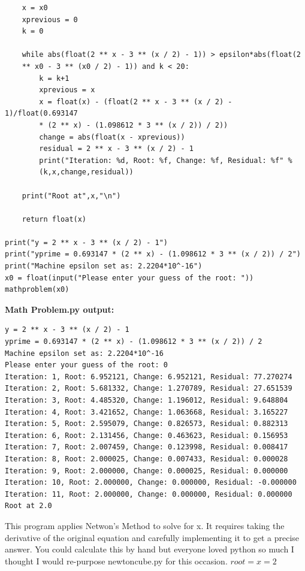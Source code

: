 \documentclass[12pt]{article}
\begin{document}
\begin{enumerate}[label=\textbf{\arabic*}.]
\begin{verbatim}
    x = x0
    xprevious = 0
    k = 0

    while abs(float(2 ** x - 3 ** (x / 2) - 1)) > epsilon*abs(float(2 
    ** x0 - 3 ** (x0 / 2) - 1)) and k < 20:
        k = k+1
        xprevious = x
        x = float(x) - (float(2 ** x - 3 ** (x / 2) - 1)/float(0.693147 
        * (2 ** x) - (1.098612 * 3 ** (x / 2)) / 2))
        change = abs(float(x - xprevious))
        residual = 2 ** x - 3 ** (x / 2) - 1
        print("Iteration: %d, Root: %f, Change: %f, Residual: %f" % 
        (k,x,change,residual))
    
    print("Root at",x,"\n")

    return float(x)

print("y = 2 ** x - 3 ** (x / 2) - 1")
print("yprime = 0.693147 * (2 ** x) - (1.098612 * 3 ** (x / 2)) / 2")
print("Machine epsilon set as: 2.2204*10^-16")
x0 = float(input("Please enter your guess of the root: "))
mathproblem(x0)
\end{verbatim}

\newpage

\textbf{Math Problem.py output:}
\begin{verbatim}
y = 2 ** x - 3 ** (x / 2) - 1
yprime = 0.693147 * (2 ** x) - (1.098612 * 3 ** (x / 2)) / 2
Machine epsilon set as: 2.2204*10^-16
Please enter your guess of the root: 0
Iteration: 1, Root: 6.952121, Change: 6.952121, Residual: 77.270274
Iteration: 2, Root: 5.681332, Change: 1.270789, Residual: 27.651539
Iteration: 3, Root: 4.485320, Change: 1.196012, Residual: 9.648804
Iteration: 4, Root: 3.421652, Change: 1.063668, Residual: 3.165227
Iteration: 5, Root: 2.595079, Change: 0.826573, Residual: 0.882313
Iteration: 6, Root: 2.131456, Change: 0.463623, Residual: 0.156953
Iteration: 7, Root: 2.007459, Change: 0.123998, Residual: 0.008417
Iteration: 8, Root: 2.000025, Change: 0.007433, Residual: 0.000028
Iteration: 9, Root: 2.000000, Change: 0.000025, Residual: 0.000000
Iteration: 10, Root: 2.000000, Change: 0.000000, Residual: -0.000000
Iteration: 11, Root: 2.000000, Change: 0.000000, Residual: 0.000000
Root at 2.0
\end{verbatim}

This program applies Netwon's Method to solve for x. It requires taking the derivative of the original equation and carefully implementing it to get a precise answer. You could calculate this by hand but everyone loved python so much I thought I would re-purpose newtoncube.py for this occasion. $root=x=2$


\end{enumerate}
\end{document}
